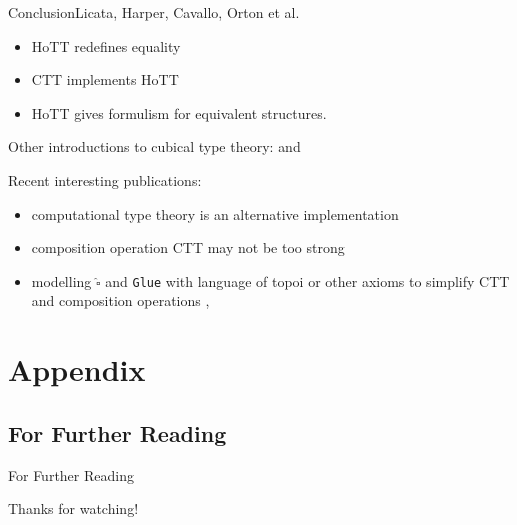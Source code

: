 \documentclass[english]{beamer}
\begin{document}
\begin{frame}{Conclusion}{Licata, Harper, Cavallo, Orton et al.}
    
    
    \begin{itemize}
        \item HoTT redefines equality
        \item CTT implements HoTT 
        \item HoTT gives formulism for equivalent structures.
    \end{itemize}
    
    Other introductions to cubical type theory: \cite{Huber2016} and \cite{Orton2019}
    
    Recent interesting publications:
    \begin{itemize}
        \item computational type theory is an alternative implementation \cite{Angiuli2018}
        \item composition operation CTT may not be too strong \cite{Cavallo2019}
        \item modelling $\widehat{\square}$ and \texttt{Glue} with language of topoi or other axioms to simplify CTT and composition operations \cite{Orton2017}, \cite{Orton2019} 
    \end{itemize}
    
    
    \end{frame}





\appendix

\section*{Appendix}

\subsection*{For Further Reading}
\begin{frame}[allowframebreaks]{For Further Reading}

Thanks for watching!



\end{frame}
\end{document}
